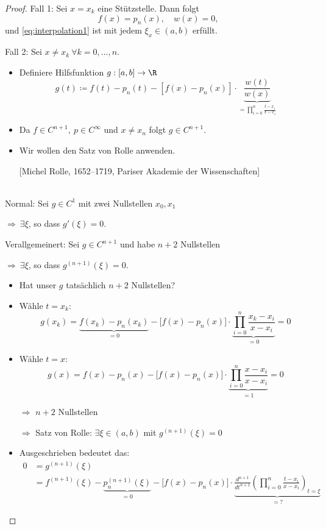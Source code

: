 \begin{proof}
  Fall 1: Sei $x=x_k$ eine Stützstelle.  Dann folgt
  \begin{equation*}
   f(x)=p_n(x),\quad w(x)=0,
  \end{equation*}
  und \eqref{eq:interpolation1} ist mit jedem $\xi_x\in (a,b)$ erfüllt.

  \bigskip

  Fall 2: Sei $x\neq x_k\ \forall k=0,\hdots,n$.
  \begin{itemize}
   \item  Definiere Hilfsfunktion $g:[a,b]\to\R$
  \begin{equation*}
    g(t) \coloneqq f(t)-p_n(t) - [ f(x) - p_n(x)]\cdot\underbrace{\frac{w(t)}{w(x)}}_{ = \prod_{i=0}^n \frac{t-x_i}{x-x_i}}
  \end{equation*}
  \item Da $f\in C^{n+1},\  p\in C^\infty$ und $x\neq x_n$ folgt $g\in C^{n+1}$.
  \item Wir wollen den Satz von Rolle anwenden.

  [Michel Rolle, 1652--1719, Pariser Akademie der Wissenschaften]

\end{itemize}
\begin{satz} \mbox{}\\
 Normal: Sei $g\in C^1$ mit zwei Nullstellen $x_0,x_1$

 \qquad \qquad $\Rightarrow\ \exists \xi$, so dass $g'(\xi)=0$.

 \medskip
 Verallgemeinert: Sei $g\in C^{n+1}$ und habe $n+2$ Nullstellen

 \qquad \qquad $\Rightarrow\ \exists \xi$, so dass $g^{(n+1)}(\xi)=0$.
\end{satz}
\begin{itemize}
 \item Hat unser $g$ tatsächlich $n+2$ Nullstellen?
 \item Wähle $t=x_k$:
 \begin{equation*}
  g(x_k) = \underbrace{f(x_k) - p_n(x_k)}_{=0}
    - \Big[ f(x) - p_n(x)\Big]\cdot\underbrace{\prod_{i=0}^n \frac{x_k-x_i}{x-x_i}}_{ =0} = 0
 \end{equation*}
 \item Wähle $t=x$:
 \begin{equation*}
    g(x) = f(x) - p_n(x) - \Big[ f(x) - p_n(x)\Big]\cdot\underbrace{\prod_{i=0}^n \frac{x-x_i}{x-x_i}}_{ =1} = 0
 \end{equation*}
 \item[$\Rightarrow$] $n+2$ Nullstellen
  \item[$\Rightarrow$] Satz von Rolle: $\exists \xi\in (a,b)$ mit $g^{(n+1)} (\xi) = 0$
  \item Ausgeschrieben bedeutet das:
  \begin{align*}
   0
   & =
   g^{(n+1)}(\xi) \\
   & =
   f^{(n+1)}(\xi) - \underbrace{p_n^{(n+1)}(\xi)}_{ =0}
      - \Big[ f(x) - p_n(x) \Big]\cdot\underbrace{\frac{d^{n+1}}{dt^{n+1}}\left(\prod_{i=0}^n \frac{t-x_i}{x-x_i} \right)_{t=\xi}}_{ = ?}
  \end{align*}


\end{itemize}
\end{proof}
